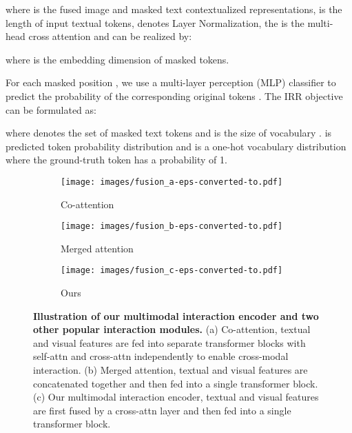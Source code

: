 \documentclass[10pt,twocolumn,letterpaper]{article}
\begin{document}
where  is the fused image and masked text contextualized representations,  is the length of input textual tokens,  denotes Layer Normalization, the  is the multi-head cross attention and can be realized by:

where  is the embedding dimension of masked tokens. 

For each masked position , we use a multi-layer perception (MLP) classifier to predict the probability of the corresponding original tokens . The IRR objective can be formulated as:

where  denotes the set of masked text tokens and  is the size of vocabulary .  is predicted token probability distribution and  is a one-hot vocabulary distribution where the ground-truth token has a probability of 1.

\begin{figure}[ht]
  \centering
  \begin{subfigure}[t]{0.38\linewidth}
    \centerline{\texttt{[image: images/fusion\_a-eps-converted-to.pdf]}}
    \caption{Co-attention}
    \label{fig4:a}
  \end{subfigure}
  \centering
  \begin{subfigure}[t]{0.3\linewidth}
    \centerline{\texttt{[image: images/fusion\_b-eps-converted-to.pdf]}}
    \caption{Merged attention}
    \label{fig4:b}
  \end{subfigure}
  \centering
  \begin{subfigure}[t]{0.3\linewidth}
    \centerline{\texttt{[image: images/fusion\_c-eps-converted-to.pdf]}}
    \caption{Ours}
    \label{fig4:c}
  \end{subfigure}

  \caption{\textbf{Illustration of our multimodal interaction encoder and two other popular interaction modules.} (a) Co-attention, textual and visual features are fed into separate transformer blocks with self-attn and cross-attn independently to enable cross-modal interaction. (b) Merged attention, textual and visual features are concatenated together and then fed into a single transformer block. (c) Our multimodal interaction encoder, textual and visual features are first fused by a cross-attn layer and then fed into a single transformer block.}
  \label{fig4}
\end{figure}
\end{document}
